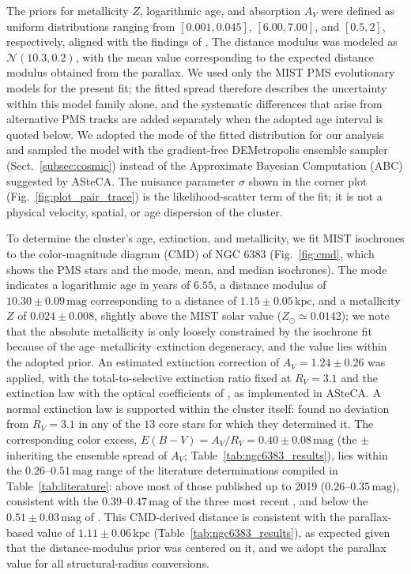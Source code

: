 \documentclass{aa}
\begin{document}
The priors for metallicity $Z$, logarithmic age, and absorption $A_V$ were defined as uniform distributions ranging from $[0.001, 0.045]$, $[6.00, 7.00]$, and $[0.5, 2]$, respectively, aligned with the findings of \citet{2024arXiv240301030P}. The distance modulus was modeled as $\mathcal{N}(10.3, 0.2)$, with the mean value corresponding to the expected distance modulus obtained from the parallax. We used only the MIST PMS evolutionary models for the present fit; the fitted spread therefore describes the uncertainty within this model family alone, and the systematic differences that arise from alternative PMS tracks are added separately when the adopted age interval is quoted below. We adopted the mode of the fitted distribution for our analysis and sampled the model with the gradient-free DEMetropolis ensemble sampler (Sect.~\ref{subsec:cosmic}) instead of the Approximate Bayesian Computation (ABC) suggested by ASteCA\@. The nuisance parameter $\sigma$ shown in the corner plot (Fig.~\ref{fig:plot_pair_trace}) is the likelihood-scatter term of the fit; it is not a physical velocity, spatial, or age dispersion of the cluster.

To determine the cluster's age, extinction, and metallicity, we fit MIST isochrones to the color-magnitude diagram (CMD) of NGC 6383 (Fig.~\ref{fig:cmd}, which shows the PMS stars and the mode, mean, and median isochrones). The mode indicates a logarithmic age in years of $6.55$, a distance modulus of $10.30\pm 0.09\,\mathrm{mag}$ corresponding to a distance of $1.15\pm0.05\,\mathrm{kpc}$, and a metallicity $Z $ of $0.024 \pm 0.008$, slightly above the MIST solar value ($Z_\odot\simeq0.0142$); we note that the absolute metallicity is only loosely constrained by the isochrone fit because of the age--metallicity--extinction degeneracy, and the value lies within the adopted prior. An estimated extinction correction of $A_V = 1.24 \pm 0.26$ was applied, with the total-to-selective extinction ratio fixed at $R_V = 3.1$ and the \citet{1989ApJ...345..245C} extinction law with the optical coefficients of \citet{1994ApJ...422..158O}, as implemented in ASteCA\@. A normal extinction law is supported within the cluster itself: \citet{2000AA...362..580V} found no deviation from $R_V = 3.1$ in any of the $13$ core stars for which they determined it. The corresponding color excess, $E(B-V) = A_V/R_V = 0.40 \pm 0.08\,\mathrm{mag}$ (the $\pm$ inheriting the ensemble spread of $A_V$; Table~\ref{tab:ngc6383_results}), lies within the $0.26$--$0.51\,\mathrm{mag}$ range of the literature determinations compiled in Table~\ref{tab:literature}: above most of those published up to 2019 ($0.26$--$0.35\,\mathrm{mag}$), consistent with the $0.39$--$0.47\,\mathrm{mag}$ of the three most recent \citep{2022ApJS..262....7H,2024arXiv240305143H,2024arXiv240301030P}, and below the $0.51 \pm 0.03\,\mathrm{mag}$ of \citet{2018AA...610A..30A}. This CMD-derived distance is consistent with the parallax-based value of $1.11 \pm 0.06\,\mathrm{kpc}$ (Table~\ref{tab:ngc6383_results}), as expected given that the distance-modulus prior was centered on it, and we adopt the parallax value for all structural-radius conversions.
\end{document}
